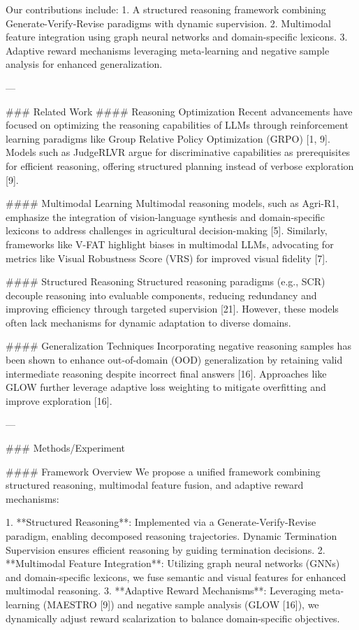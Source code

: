Our contributions include:
1. A structured reasoning framework combining Generate-Verify-Revise paradigms with dynamic supervision.
2. Multimodal feature integration using graph neural networks and domain-specific lexicons.
3. Adaptive reward mechanisms leveraging meta-learning and negative sample analysis for enhanced generalization.

---

### Related Work
#### Reasoning Optimization
Recent advancements have focused on optimizing the reasoning capabilities of LLMs through reinforcement learning paradigms like Group Relative Policy Optimization (GRPO) [1, 9]. Models such as JudgeRLVR argue for discriminative capabilities as prerequisites for efficient reasoning, offering structured planning instead of verbose exploration [9].

#### Multimodal Learning
Multimodal reasoning models, such as Agri-R1, emphasize the integration of vision-language synthesis and domain-specific lexicons to address challenges in agricultural decision-making [5]. Similarly, frameworks like V-FAT highlight biases in multimodal LLMs, advocating for metrics like Visual Robustness Score (VRS) for improved visual fidelity [7].

#### Structured Reasoning
Structured reasoning paradigms (e.g., SCR) decouple reasoning into evaluable components, reducing redundancy and improving efficiency through targeted supervision [21]. However, these models often lack mechanisms for dynamic adaptation to diverse domains.

#### Generalization Techniques
Incorporating negative reasoning samples has been shown to enhance out-of-domain (OOD) generalization by retaining valid intermediate reasoning despite incorrect final answers [16]. Approaches like GLOW further leverage adaptive loss weighting to mitigate overfitting and improve exploration [16].

---

### Methods/Experiment

#### Framework Overview
We propose a unified framework combining structured reasoning, multimodal feature fusion, and adaptive reward mechanisms:

1. **Structured Reasoning**: Implemented via a Generate-Verify-Revise paradigm, enabling decomposed reasoning trajectories. Dynamic Termination Supervision ensures efficient reasoning by guiding termination decisions.
2. **Multimodal Feature Integration**: Utilizing graph neural networks (GNNs) and domain-specific lexicons, we fuse semantic and visual features for enhanced multimodal reasoning.
3. **Adaptive Reward Mechanisms**: Leveraging meta-learning (MAESTRO [9]) and negative sample analysis (GLOW [16]), we dynamically adjust reward scalarization to balance domain-specific objectives.

